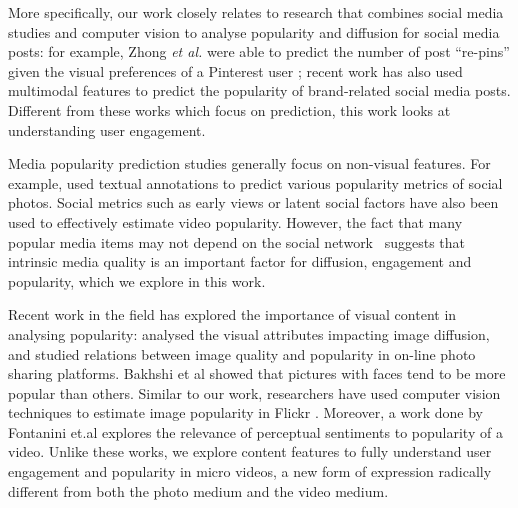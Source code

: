 More specifically, our work closely relates to research that combines social media studies and computer vision to analyse popularity and diffusion for social media posts: for example, Zhong \textsl{et al.} were able to predict the number of post ``re-pins''  given the visual preferences of a Pinterest user \cite{predictingPintrest}; recent work \cite{Mazloom:2016:MPP:2964284.2967210} has also used multimodal features to predict the popularity of brand-related social media posts. Different from these works which focus on prediction,  this work looks at understanding user engagement. 

Media popularity prediction studies generally focus on non-visual features.  For example, \cite{Yamasaki:2014} used textual annotations to predict various popularity metrics of social photos. Social metrics such as early views \cite{pinto2013using} or latent social factors \cite{nwana2013latent} have also been used to effectively estimate video popularity. However, the fact that many popular media items may not depend on the social  network~\cite{Cha2009Flickr} suggests that intrinsic media quality is an important factor for diffusion, engagement and popularity, which we explore in this work.

Recent work in the field has explored the importance of visual content in analysing popularity: \cite{totti14impact} analysed the visual attributes impacting image diffusion,  and \cite{schifanella2015image} studied relations between image quality and popularity in on-line photo sharing platforms.  Bakhshi et al  \cite{bakhshi2014faces} showed that pictures with faces tend to be more popular than others. Similar to our work, researchers have used computer vision techniques to estimate image popularity in Flickr \cite{Khosla:2014}. Moreover, a work done by Fontanini et.al \cite{fontanini2016web} explores the relevance of perceptual sentiments to popularity of a video. 
Unlike these works, we  explore content features to fully understand user engagement and popularity in micro videos, a new form of expression radically different from both the photo medium and the video medium.%

